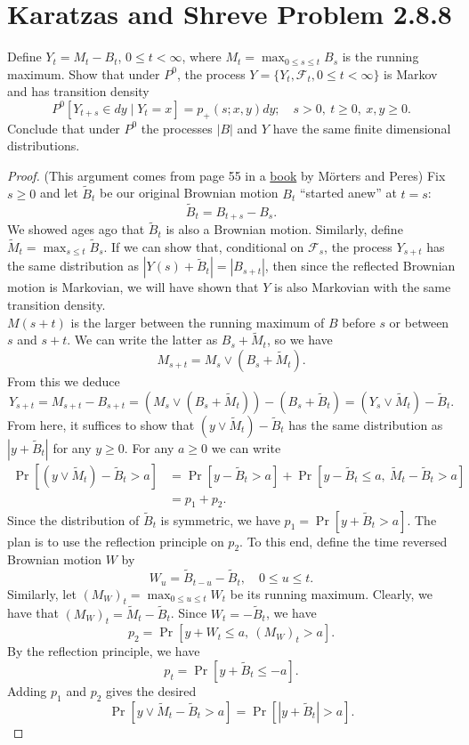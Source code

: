 \documentclass[11pt,letterpaper]{report}
\newcommand{\mcal}[1]{\mathcal{#1}}
\begin{document}
\section*{Karatzas and Shreve Problem 2.8.8}
Define $Y_t = M_t - B_t$, $0\leq t<\infty$, where $M_t = \max_{0\leq s\leq t}B_s$ is the running maximum. Show that under $P^0$, the process $Y = \{Y_t, \mcal{F}_t, 0\leq t<\infty\}$ is Markov and has transition density
\[
P^0[Y_{t+s}\in dy\mid Y_t = x]=p_+(s; x,y)dy;\quad s>0,\ t\geq 0,\ x,y\geq 0.
\]
Conclude that under $P^0$ the processes $|B|$ and $Y$ have the same finite dimensional distributions.
\begin{proof}
	(This argument comes from page 55 in a \href{https://www.stat.berkeley.edu/~aldous/205B/bmbook.pdf}{book} by M\"orters and Peres) Fix $s\geq 0$ and let $\tilde{B}_t$ be our original Brownian motion $B_t$ ``started anew'' at $t=s$:
	\[
	\tilde{B}_t = B_{t+s} - B_s.
	\]
	We showed ages ago that $\tilde{B}_t$ is also a Brownian motion. Similarly, define $\tilde{M}_t = \max_{s\leq t}\tilde{B}_s$. If we can show that, conditional on $\mcal{F}_s$, the process $Y_{s+t}$ has the same distribution as $|Y(s)+\tilde{B}_t| = |B_{s+t}|$, then since the reflected Brownian motion is Markovian, we will have shown that $Y$ is also Markovian with the same transition density.\\

	\noindent $M(s+t)$ is the larger between the running maximum of $B$ before $s$ or between $s$ and $s+t$. We can write the latter as $B_s + \tilde{M}_t$, so we have
	\[
	M_{s+t} = M_s\lor (B_s + \tilde{M}_t).
	\]
	From this we deduce
	\[
	Y_{s+t} = M_{s+t}-B_{s+t} = (M_s\lor (B_s + \tilde M_t)) - (B_s + \tilde B_t) = (Y_s\lor \tilde M_t) - \tilde B_t.
	\]
	From here, it suffices to show that $(y\lor \tilde M_t) - \tilde B_t$ has the same distribution as $|y+\tilde B_t|$ for any $y\geq 0$. For any $a\geq 0$ we can write
	\begin{align*}
		\Pr[(y\lor \tilde M_t) - \tilde B_t > a] &= \Pr[y-\tilde B_t>a] + \Pr[y-\tilde B_t\leq a,\ \tilde M_t - \tilde B_t > a]\\
		&= p_1 + p_2.
	\end{align*}
	Since the distribution of $\tilde{B}_t$ is symmetric, we have $p_1 = \Pr[y+\tilde B_t > a]$. The plan is to use the reflection principle on $p_2$. To this end, define the time reversed Brownian motion $W$ by
	\[
	W_u = \tilde B_{t-u}-\tilde B_t,\quad 0\leq u\leq t.
	\]
	Similarly, let $(M_W)_t = \max_{0\leq u\leq t}W_t$ be its running maximum. Clearly, we have that $(M_W)_t = \tilde M_t - \tilde B_t$. Since $W_t = -\tilde B_t$, we have
	\[
	p_2 = \Pr[y + W_t\leq a,\ (M_W)_t > a].
	\]
	By the reflection principle, we have
	\[
	p_t = \Pr[y+\tilde B_t \leq -a].
	\]
	Adding $p_1$ and $p_2$ gives the desired
	\[
	\Pr[y\lor \tilde M_t - \tilde B_t > a] = \Pr[|y+\tilde B_t|>a].
	\]
\end{proof}
\end{document}
